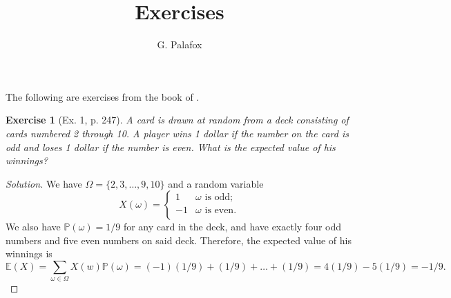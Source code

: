 \documentclass[letterpaper, 10 pt, conference]{article}
\title{Exercises
}
\author{G. Palafox}
\newtheorem{ex}{Exercise}
\newcommand\E{\ensuremath{\mathbb{E}}}
\renewcommand{\P}{\ensuremath{\mathbb{P}}}
\newcommand\Om{\ensuremath{\Omega}}
\newcommand{\w}{\ensuremath{\omega}}
\begin{document}
\maketitle
The following are exercises from the book of \citet{snell}.

\begin{ex}[Ex. 1, p. 247]
	A card is drawn at random from a deck consisting of cards numbered 2 through 10. A player wins 1 dollar if the number on the card is odd and loses 1 dollar if the number is even. What is the expected value of his winnings?
\end{ex}
\begin{proof}[Solution]
	We have $\Om = \lbrace 2, 3, \dots, 9, 10\rbrace$ and a random variable 
	\begin{equation}
		X(\w) = \begin{cases}
		1 & \w \text{ is odd;} \\
		-1 & \w \text{ is even.}\\
		\end{cases}
	\end{equation}
We also have $\P(\w) = 1/9$ for any card in the deck, and have exactly four odd numbers and five even numbers on said deck. Therefore, the expected value of his winnings is
\begin{equation}
	\E(X) = \sum_{\w \in \Om} X(w) \P( \w) =(-1)(1/9) +  (1/9) + \dots + (1/9) = 4(1/9) - 5(1/9) = -1/9.
\end{equation}
\end{proof}
\end{document}
